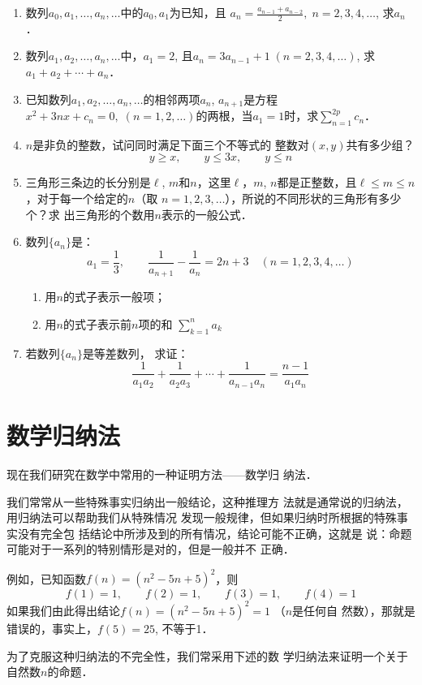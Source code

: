 \begin{enumerate}
\item 数列$a_0,a_1,\ldots, a_n,\ldots$中的$a_0,a_1$为已知，且
$a_n=\frac{a_{n-1}+a_{n-2}}{2},\; n=2,3,4,\ldots$, 求$a_n$．

\item 数列$a_1,a_2,\ldots,a_n,\ldots$中，$a_1=2$, 且$a_n=3a_{n-1}+1\; (n=2,3,4,\ldots )$, 求$a_1+a_2+\cdots +a_n$．
\item 已知数列$a_1,a_2,\ldots ,a_n,\ldots$的相邻两项$a_n$,
$a_{n+1}$是方程$x^2+3nx+c_n=0,\; (n=1,2,\ldots)$的两根，当$a_1=
1$时，求$\sum^{2p}_{n=1}c_n$．
\item $n$是非负的整数，试问同时满足下面三个不等式的
整数对$(x,y)$共有多少组？
\[y\ge x,\qquad y\le 3x,\qquad y\le n\]
\item 三角形三条边的长分别是$\ell$, $m$和$n$，这里$\ell$，$m$,
$n$都是正整数，且$\ell\le m\le n$，对于每一个给定的$n$（取
$n=1,2,3,\ldots$），所说的不同形状的三角形有多少个？求
出三角形的个数用$n$表示的一般公式．
\item 数列$\{a_n\}$是：
\[a_1=\frac{1}{3},\qquad \frac{1}{a_{n+1}}-\frac{1}{a_n}=2n+3\quad (n=1,2,3,4,\ldots)\]
\begin{enumerate}
    \item 用$n$的式子表示一般项；
    \item 用$n$的式子表示前$n$项的和 $\displaystyle\sum^n_{k=1}a_k$
\end{enumerate}

\item 若数列$\{a_n\}$是等差数列，
求证：\[\frac{1}{a_1a_2}+\frac{1}{a_2a_3}+\cdots+\frac{1}{a_{n-1}a_n}=\frac{n-1}{a_1a_n}\]
\end{enumerate}

\section{数学归纳法}
现在我们研究在数学中常用的一种证明方法——数学归
纳法．

我们常常从一些特殊事实归纳出一般结论，这种推理方
法就是通常说的归纳法，用归纳法可以帮助我们从特殊情况
发现一般规律，但如果归纳时所根据的特殊事实没有完全包
括结论中所涉及到的所有情况，结论可能不正确，这就是
说：命题可能对于一系列的特别情形是对的，但是一般并不
正确．

例如，已知函数$f(n)=(n^2-5n+5)^2$，则
\[f(1)=1,\qquad f(2)=1,\qquad f(3)=1,\qquad f(4)=1 \]
如果我们由此得出结论$f(n)=(n^2-5n+5)^2=1$ （$n$是任何自
然数），那就是错误的，事实上，$f(5)=25$, 不等于1．

为了克服这种归纳法的不完全性，我们常采用下述的数
学归纳法来证明一个关于自然数$n$的命题．

